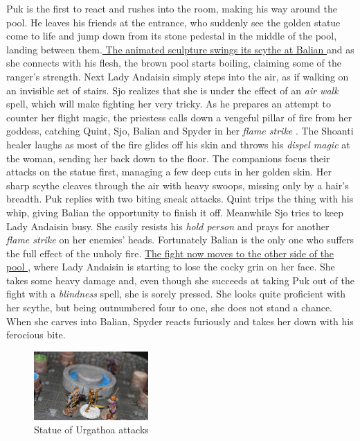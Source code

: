 Puk is the first to react and rushes into the room, making his way around the pool. He leaves his friends at the entrance, who suddenly see the golden statue come to life and jump down from its stone pedestal in the middle of the pool, landing between them.\hyperref[fig:Statue-of-Urgathoa-attacks-523052019]{ The animated sculpture swings its scythe at Balian } and as she connects with his flesh, the brown pool starts boiling, claiming some of the ranger's strength. Next Lady Andaisin simply steps into the air, as if walking on an invisible set of stairs. Sjo realizes that she is under the effect of an  {\itshape air walk} spell, which will make fighting her very tricky. As he prepares an attempt to counter her flight magic, the priestess calls down a vengeful pillar of fire from her goddess, catching Quint, Sjo, Balian and Spyder in her  {\itshape flame strike} . The Shoanti healer laughs as most of the fire glides off his skin and throws his  {\itshape dispel magic} at the woman, sending her back down to the floor. The companions focus their attacks on the statue first, managing a few deep cuts in her golden skin. Her sharp scythe cleaves through the air with heavy swoops, missing only by a hair's breadth. Puk replies with two biting sneak attacks. Quint trips the thing with his whip, giving Balian the opportunity to finish it off. Meanwhile Sjo tries to keep Lady Andaisin busy. She easily resists his  {\itshape hold person} and prays for another  {\itshape flame strike} on her enemies' heads. Fortunately Balian is the only one who suffers the full effect of the unholy fire. \hyperref[fig:Facing-Lady-Andaisin-523052184]{ The fight now moves to the other side of the pool } , where Lady Andaisin is starting to lose the cocky grin on her face. She takes some heavy damage and, even though she succeeds at taking Puk out of the fight with a  {\itshape blindness} spell, she is sorely pressed. She looks quite proficient with her scythe, but being outnumbered four to one, she does not stand a chance. When she carves into Balian, Spyder reacts furiously and takes her down with his ferocious bite. \\

\begin{figure}[h]
	\centering
	\includegraphics[width=0.39\textwidth]{images/Statue-of-Urgathoa-attacks-523052019.jpg}
	\caption{Statue of Urgathoa attacks}
	\label{fig:Statue-of-Urgathoa-attacks-523052019}
\end{figure}

